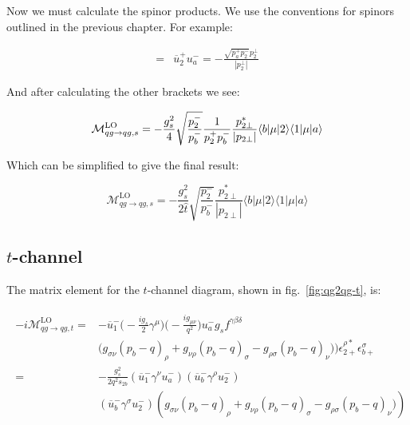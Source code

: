 			Now we must calculate the spinor products.  We use the conventions for spinors outlined in the
			previous chapter.  For example:

			\begin{align}
				[2a] = &\overline{u}^+_2u^-_a=-\frac{\sqrt{p_a^+p_2^-}p_2^\perp}{|p_2^\perp|}
			\end{align}

			And after calculating the other brackets we see:

			\begin{equation}
				\mathcal{M}_{qg\rightarrow qg, s}^{\text{LO}} = -\frac{g_s^2}{4}\sqrt{\frac{p_2^-}{p_b^-}}\frac{1}{p_2^+p_b^-} \frac{p_{2\perp}^*}{|p_{2\perp}|} \langle b | \mu | 2 \rangle \langle 1 | \mu | a \rangle
			\end{equation}

			Which can be simplified to give the final result:

			\begin{equation}
				\mathcal{M}_{qg\rightarrow qg, s}^{\text{LO}}=-\frac{g_s^2}{2\hat{t}}\sqrt{\frac{p_2^-}{p_b^-}}\frac{p_{2\perp}^*}
				{|p_{2\perp}|}\langle{b}|\mu|2\rangle\langle{1}|\mu|a\rangle
				\label{eqn:s-channel}
			\end{equation}

		\subsection{$t$-channel}

			The matrix element for the $t$-channel diagram, shown in fig.~\eqref{fig:qg2qg-t}, is:

			\begin{align}
			\begin{split}
				-i\mathcal{M}_{qg\rightarrow qg, t}^{\text{LO}} =&-\overline{u}^-_1\Bigg(-\frac{ig_s}{2}\gamma^\mu\Bigg)\Bigg(-\frac{ig_{\mu\nu}}{q^2}\Bigg)u^-_ag_sf^{\gamma\beta\delta}\\
				&\Big(g_{\sigma\nu}(p_b-q)_\rho + g_{\nu\rho}(p_b-q)_\sigma - g_{\rho\sigma}(p_b-q)_\nu)\Big)\epsilon^{\rho *}_{2+}\epsilon^{\sigma}_{b+}\\
				=&-\frac{g_s^2}{2q^2s_{2b}}\left(\overline{u}^-_1\gamma^{\nu}u^-_a\right)\left(\overline{u}^-_b\gamma^{\rho}u^-_2\right)\\
				&\left(\overline{u}^-_b\gamma^{\sigma}u^-_2\right)\left(g_{\sigma\nu}(p_b-q)_\rho + g_{\nu\rho}(p_b-q)_\sigma - g_{\rho\sigma}(p_b-q)_\nu)\right)
			\end{split}
			\end{align}

